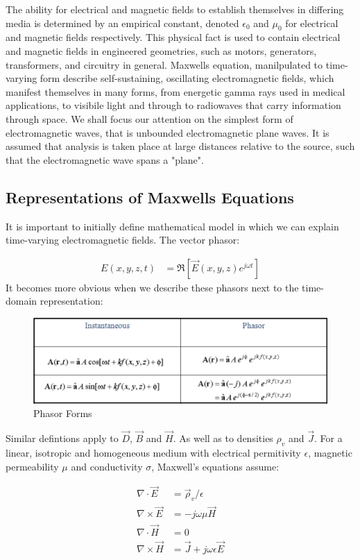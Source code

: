 \documentclass{book}
\begin{document}
The ability for electrical and magnetic fields to establish themselves in differing media is determined by an empirical constant, denoted $\epsilon_0$ and $\mu_0$ for electrical and magnetic fields respectively. This physical fact is used to contain electrical and magnetic fields in engineered geometries, such as motors, generators, transformers, and circuitry in general.
\newline
Maxwells equation, manilpulated to time-varying form describe self-sustaining, oscillating electromagnetic fields, which manifest themselves in many forms, from energetic gamma rays used in medical applications, to visibile light and through to radiowaves that carry information through space. We shall focus our attention on the simplest form of electromagnetic waves, that is unbounded electromagnetic plane waves. It is assumed that analysis is taken place at large distances relative to the source, such that the electromagnetic wave spans a "plane". 
\newline

\subsection{Representations of Maxwells Equations}
It is important to initially define mathematical model in which we can explain time-varying electromagnetic fields. The vector phasor:

\begin{align*}
	E(x,y,z,t) &= \Re [\vec{E} (x,y,z)e^{j\omega t}]
\end{align*} 
It becomes more obvious when we describe these phasors next to the time-domain representation:

\begin{figure}
	\centering
	\includegraphics[width=0.5\linewidth]{Screenshots/phasor}
	\caption{Phasor Forms}
	\label{fig:phasor}
\end{figure}

Similar defintions apply to $\vec{D}$, $\vec{B}$ and $\vec{H}$. As well as to densities $\rho_v$ and $\vec{J}$. For a linear, isotropic and homogeneous medium with electrical permitivity $\epsilon$, magnetic permeability $\mu$ and conductivity $\sigma$, Maxwell's equations assume:

\begin{align}
	\nabla \cdot \vec{E} &= \vec{\rho}_v / \epsilon \\
	\nabla \times \vec{E} &= - j\omega \mu \vec{H} \\ 
	\nabla \cdot \vec{H} &= 0 \\
	\nabla \times \vec{H} &= \vec{J} + j\omega \epsilon \vec{E}
\end{align} 
\end{document}
